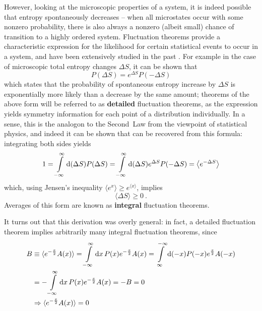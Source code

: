 However, looking at the microscopic properties of a system, it is indeed possible that entropy spontaneously decreases -- when all microstates occur with some nonzero probability, there is also always a nonzero (albeit small) chance of transition to a highly ordered system. Fluctuation theorems provide a characteristic expression for the likelihood for certain statistical events to occur in a system, and have been extensively studied in the past \cite{seifert-review, seifert-overdamped, crooks, esposito, evans-cohen-morriss, gallavotti-cohen, evans-searles, kurchan, lebowitz-spohn, jarzynski, crooks99, crooks00, maes, hatano-sasa, gaspard, kurchan2, harris}. For example in the case of microscopic total entropy changes \(\Delta S\), it can be shown that
%
\begin{equation}
	P(\Delta S) = e^{\Delta S}P(-\Delta S)
\end{equation}
%
which states that the probability of spontaneous entropy increase by \(\Delta S\) is exponentially more likely than a decrease by the same amount; theorems of the above form will be referred to as \textbf{detailed} fluctuation theorems, as the expression yields symmetry information for each point of a distribution individually. In a sense, this is the analogon to the Second~Law from the viewpoint of statistical physics, and indeed it can be shown that  can be recovered from this formula: integrating both sides yields
%
\begin{equation}
	\label{eqn:average of exp}
	1 = \int\limits_{-\infty}^\infty \mathrm{d} (\Delta S) P(\Delta S) = \int\limits_{-\infty}^\infty \mathrm{d} (\Delta S) e^{\Delta S}P(-\Delta S) = \left\langle e^{-\Delta S} \right\rangle
\end{equation}
%
which, using Jensen's inequality \(\langle e^x\rangle \geq e^{\langle x\rangle}\), implies
%
\begin{equation}
	\langle\Delta S\rangle \geq 0 ~.
\end{equation}
%
Averages of this form are known as \textbf{integral} fluctuation theorems.

It turns out that this derivation was overly general: in fact, a detailed fluctuation theorem implies arbitrarily many integral fluctuation theorems, since
%
\begin{align}
	   B
	&\equiv \langle e^{-\frac x2}A(x)\rangle
	= \int\limits_{-\infty}^\infty\mathrm{d} x \, P(x) e^{-\frac x2}A(x)
	= \int\limits_\infty^{-\infty}\mathrm{d}(-x) P(-x) e^{\frac x2}A(-x) \notag \\
	&= - \int\limits_{-\infty}^\infty\mathrm{d} x \, P(x) e^{-\frac x2}A(x)
	 = -B
	 = 0 \notag \\
	\label{eqn:antisymmetric exp average}
	&\Rightarrow
	\langle e^{-\frac x2}A(x)\rangle = 0
\end{align}

